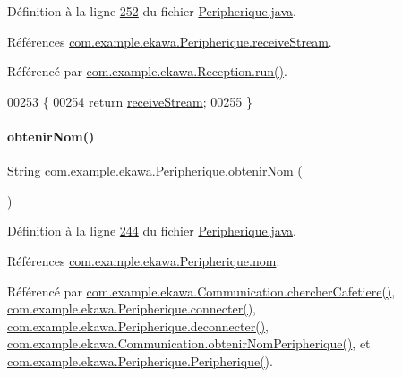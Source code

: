Définition à la ligne \hyperlink{_peripherique_8java_source_l00252}{252} du fichier \hyperlink{_peripherique_8java_source}{Peripherique.\+java}.



Références \hyperlink{_peripherique_8java_source_l00042}{com.\+example.\+ekawa.\+Peripherique.\+receive\+Stream}.



Référencé par \hyperlink{_reception_8java_source_l00043}{com.\+example.\+ekawa.\+Reception.\+run()}.


\begin{DoxyCode}
00253     \{
00254         \textcolor{keywordflow}{return} \hyperlink{classcom_1_1example_1_1ekawa_1_1_peripherique_af46a939491178c90c1ecd75dd781f4b6}{receiveStream};
00255     \}
\end{DoxyCode}
\mbox{\label{classcom_1_1example_1_1ekawa_1_1_peripherique_ad54cfafe03dfcf18cbd9b20602c4d86e}} 
\paragraph{\texorpdfstring{obtenir\+Nom()}{obtenirNom()}}
{\footnotesize\ttfamily String com.\+example.\+ekawa.\+Peripherique.\+obtenir\+Nom (\begin{DoxyParamCaption}{ }\end{DoxyParamCaption})}



Définition à la ligne \hyperlink{_peripherique_8java_source_l00244}{244} du fichier \hyperlink{_peripherique_8java_source}{Peripherique.\+java}.



Références \hyperlink{_peripherique_8java_source_l00037}{com.\+example.\+ekawa.\+Peripherique.\+nom}.



Référencé par \hyperlink{_communication_8java_source_l00276}{com.\+example.\+ekawa.\+Communication.\+chercher\+Cafetiere()}, \hyperlink{_peripherique_8java_source_l00101}{com.\+example.\+ekawa.\+Peripherique.\+connecter()}, \hyperlink{_peripherique_8java_source_l00150}{com.\+example.\+ekawa.\+Peripherique.\+deconnecter()}, \hyperlink{_communication_8java_source_l00379}{com.\+example.\+ekawa.\+Communication.\+obtenir\+Nom\+Peripherique()}, et \hyperlink{_peripherique_8java_source_l00052}{com.\+example.\+ekawa.\+Peripherique.\+Peripherique()}.


